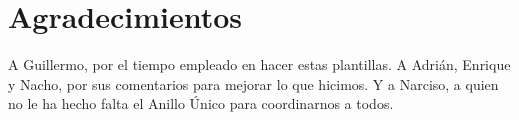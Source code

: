 
\chapter*{Agradecimientos}

A Guillermo, por el tiempo empleado en hacer estas plantillas. A Adrián, Enrique y Nacho,
por sus comentarios para mejorar lo que hicimos. Y a Narciso, a quien no le ha hecho
falta el Anillo Único para coordinarnos a todos.
